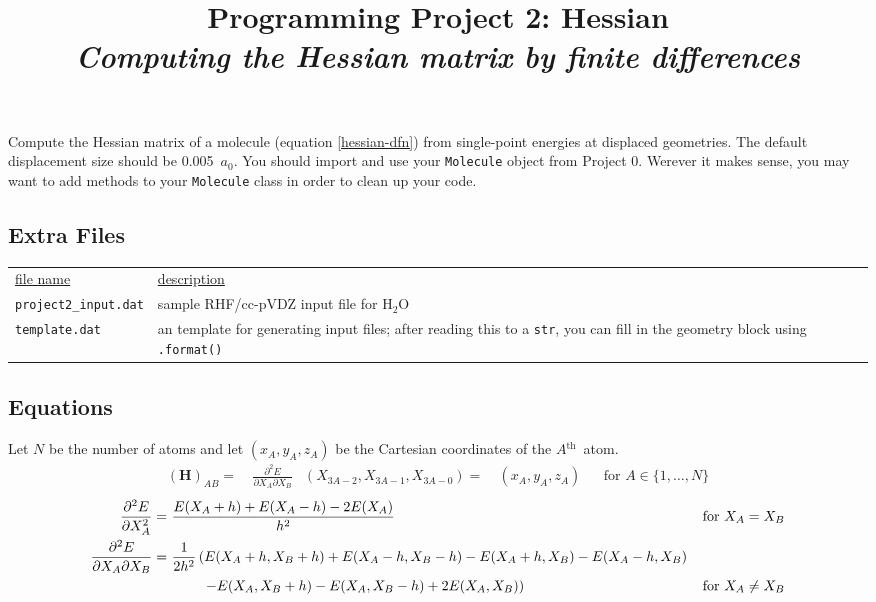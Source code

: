 \documentclass[fleqn]{article}
\title{Programming Project 2: Hessian\\
\textit{Computing the Hessian matrix by finite differences}}
\author{}
\date{}
\newcommand{\linl}[1]{\lstinline{#1}{}}
\newcommand{\eth}{\ensuremath{^\text{th}}}
\newcommand{\ul}[1]{\underline{#1}}
\newcommand{\ld}{\ensuremath{\ldots}}
\newcommand{\bo}[1]{\ensuremath{\mathbf{#1}}}
\newcommand{\fr}[2]{\ensuremath{\dfrac{#1}{#2}}}
\newcommand{\pd}[2]{\ensuremath{\frac{\partial#1}{\partial#2}}}
\newcommand{\pt}{\ensuremath{\partial}}
\begin{document}
\maketitle
\vspace{-1cm}

\noindent
Compute the Hessian matrix of a molecule (equation \ref{hessian-dfn}) from single-point energies at displaced geometries.
The default displacement size should be 0.005~$a_0$.
You should import and use your \linl{Molecule} object from Project 0.
Werever it makes sense, you may want to add methods to your \linl{Molecule} class in order to clean up your code.

\subsection*{Extra Files}
\begin{tabular}{p{}@{}p{}}
  \ul{file name} & \ul{description} \\
  \linl{project2_input.dat}
  & sample RHF/cc-pVDZ input file for H$_2$O\\
  \linl{template.dat}
  & an template for generating input files; after reading this to a \linl{str}, you can fill in the geometry block using \linl{.format()}\\ 
\end{tabular}


\subsection*{Equations}
Let $N$ be the number of atoms and let $(x_A, y_A, z_A)$ be the Cartesian coordinates of the $A$\eth\ atom.
\begin{align}
\label{hessian-dfn}
  (\bo{H})_{AB}
=&\
  \pd{^2E}{X_A\pt X_B}
&
  (X_{3A-2}, X_{3A-1}, X_{3A-0})=&\ (x_A, y_A, z_A)
&&
  \text{for $A\in\{1,\ld,N\}$}
\end{align}
{\small
\begin{align}
\label{diagonal-elements}
  \pd{^2E}{X_A^2}
=&\
  \fr{E(X_A+h)+E(X_A-h)-2E(X_A)}{h^2}
&\text{for $X_A= X_B$}
\\
\nonumber
  \pd{^2E}{X_A\pt X_B}
=&\
  \fr{1}{2h^2}
  \left(E(X_A+h,X_B+h) + E(X_A-h,X_B-h) - E(X_A+h,X_B)-E(X_A-h,X_B)\right.
\\&\
\label{off-diagonal-elements}
  \hphantom{\fr{1}{2h^2}(}
  \left.- E(X_A,X_B+h) - E(X_A,X_B-h) + 2E(X_A,X_B)\right)
&\text{for $X_A\neq X_B$}
\end{align}}
\end{document}
